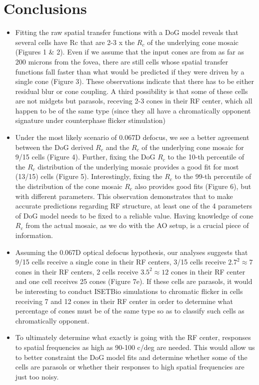 \documentclass[11pt, oneside]{article}   	%
\begin{document}
 \section{Conclusions}
\begin{itemize}

\item Fitting the raw spatial transfer functions with a DoG model reveals that several cells have Rc that are 2-3 x the $R_c$ of the underlying cone mosaic (Figures 1 \& 2). Even if we assume that the input cones are from as far as 200 microns from the fovea, there are still cells whose spatial transfer functions fall faster than what would be predicted if they were driven by a single cone (Figure 3).  These observations indicate that there has to be either residual blur or cone coupling. A third possibility is that some of these cells are not midgets but parasols, receving 2-3 cones in their RF center, which all happen to be of the same type (since they all have a chromatically opponent signature under counterphase flicker stimulation)\\

\item Under the most likely scenario of 0.067D defocus, we see a better agreement between the DoG derived $R_c$ and the $R_c$ of the underlying cone mosaic for 9/15 cells (Figure 4). Further, fixing the DoG $R_c$ to the 10-th  percentile of the $R_c$ distribution of the underlying mosaic provides a good fit for most (13/15) cells (Figure 5). Interestingly, fixing the  $R_c$ to the 99-th percentile of the distribution of the cone mosaic  $R_c$ also provides good fits (Figure 6), but with different parameters. This observation demonstrates that to make  accurate predictions regarding RF structure, at least one of the 4 parameters of DoG model needs to be fixed to a reliable value. Having knowledge of cone $R_c$  from the actual mosaic, as we do with the AO setup, is a crucial piece of information.

\item Assuming the 0.067D optical defocus hypothesis, our analyses suggests that 9/15 cells receive a single cone in their RF centers, 3/15 cells receive $2.7^2 \approx 7$ cones in their RF centers, 2 cells receive $3.5^2 \approx 12$ cones in their RF center and one cell receives 25 cones (Figure 7e). If these cells are parasols, it would be interesting to conduct ISETBio simulations to chromatic flicker in cells receiving 7 and 12 cones in their RF center in order to determine what percentage of cones must be of the same type so as to classify such cells as chromatically opponent.

\item To ultimately determine what exactly is going with the RF center, responses to spatial frequencies as high as 90-100 c/deg are needed. This would allow us to better constraint the DoG model fits and determine whether some of the cells are parasols or whether their responses to high spatial frequencies are just too noisy.\\

\end{itemize}
\end{document}
